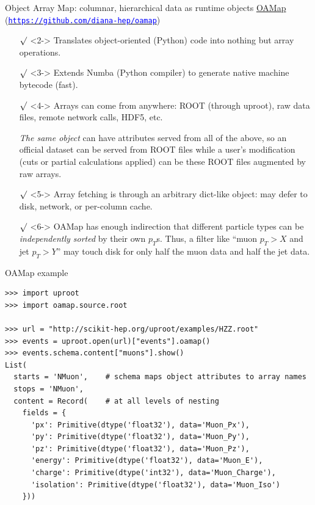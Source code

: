 \documentclass[aspectratio=169]{beamer}
\begin{document}
\begin{frame}{Object Array Map: columnar, hierarchical data as runtime objects}
\vspace{0.35 cm}
\underline{OAMap} (\href{https://github.com/diana-hep/oamap}{\textcolor{blue}{\tt https://github.com/diana-hep/oamap}})

\vspace{0.25 cm}
\begin{itemize}\setlength{\itemsep}{0.2 cm}
\item[$\surd$]<2-> Translates object-oriented (Python) code into nothing but array operations.
\item[$\surd$]<3-> Extends Numba (Python compiler) to generate native machine bytecode (fast).
\item[$\surd$]<4-> Arrays can come from anywhere: ROOT (through uproot), raw data files, remote network calls, HDF5, etc.

\vspace{0.2 cm}
{\it The same object} can have attributes served from all of the above, so an official dataset can be served from ROOT files while a user's modification (cuts or partial calculations applied) can be these ROOT files augmented by raw arrays.

\item[$\surd$]<5-> Array fetching is through an arbitrary dict-like object: may defer to disk, network, or per-column cache.

\item[$\surd$]<6-> OAMap has enough indirection that different particle types can be {\it independently sorted} by their own $p_T$s. Thus, a filter like ``muon $p_T > X$ and jet $p_T > Y$'' may touch disk for only half the muon data and half the jet data.
\end{itemize}
\end{frame}

\begin{frame}[fragile]{OAMap example}
\small
\begin{verbatim}
>>> import uproot
>>> import oamap.source.root

>>> url = "http://scikit-hep.org/uproot/examples/HZZ.root"
>>> events = uproot.open(url)["events"].oamap()
>>> events.schema.content["muons"].show()
List(
  starts = 'NMuon',    # schema maps object attributes to array names
  stops = 'NMuon',
  content = Record(    # at all levels of nesting
    fields = {
      'px': Primitive(dtype('float32'), data='Muon_Px'),
      'py': Primitive(dtype('float32'), data='Muon_Py'),
      'pz': Primitive(dtype('float32'), data='Muon_Pz'),
      'energy': Primitive(dtype('float32'), data='Muon_E'),
      'charge': Primitive(dtype('int32'), data='Muon_Charge'),
      'isolation': Primitive(dtype('float32'), data='Muon_Iso')
    }))
\end{verbatim}
\end{frame}
\end{document}
